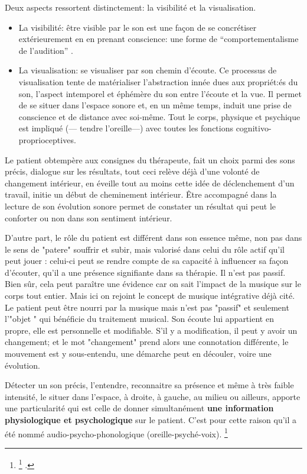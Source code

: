 Deux aspects ressortent distinctement: la visibilité et la visualisation.
\begin{itemize}
 
\item La visibilité: être visible par le son est une façon de se concrétiser extérieurement en en prenant conscience: une forme de ``comportementalisme de l'audition'' .


\item La visualisation: se visualiser par son chemin d'écoute.  
Ce processus de visualisation tente de matérialiser l'abstraction innée dues aux propriét:és du son, l'aspect intemporel et éphémère du son entre l'écoute et la vue.
Il permet de se situer dans l'espace sonore et, en un même temps, induit une prise de conscience et de distance avec soi-même. Tout le corps, physique et psychique est impliqué (--- tendre l'oreille---) avec toutes les fonctions cognitivo-proprioceptives.

\end{itemize}

Le patient obtempère aux consignes du thérapeute, fait un choix parmi des sons précis, dialogue sur les résultats, tout ceci relève déjà d'une volonté de changement intérieur, en  éveille tout au moins cette idée de déclenchement d'un travail, initie un début de cheminement intérieur.
Être accompagné dans la lecture de son évolution sonore permet de constater un résultat qui  peut le conforter ou non dans son sentiment intérieur.
	
	D'autre part, le rôle du patient est différent dans son essence même, non pas dans le sens de "patere" souffrir et subir, mais valorisé dans celui du rôle actif qu'il peut jouer : celui-ci peut se rendre compte de sa capacité à influencer sa façon d'écouter, qu'il a une présence signifiante dans sa thérapie.  Il n'est pas passif. Bien sûr, cela peut paraître une évidence car on sait l'impact de la musique sur le corps tout entier. Mais ici on rejoint  le concept de musique intégrative déjà cité\autocite[Cf.]{vrait_musicotherapie_2018}. Le patient peut être nourri par la musique mais n'est pas "passif" et seulement l'"objet " qui bénéficie du traitement musical. Son  écoute lui appartient en propre, elle est personnelle et modifiable. S'il y a modification, il peut y avoir un changement; et le mot "changement" prend alors une connotation différente,  le mouvement est y  sous-entendu,  une démarche peut en découler, voire une évolution. 



 Détecter un son précis, l'entendre, reconnaitre sa présence et même à très
 faible intensité, le situer dans l'espace, à droite, à gauche, au
 milieu ou ailleurs,  apporte une particularité qui est celle de  donner simultanément  \textbf{une information
   physiologique et psychologique} sur le patient.
 C'est pour cette raison qu'il a été nommé
 audio-psycho-phonologique (oreille-psyché-voix). \footnote{\footnote{Avec le professeur Tomatis: formation suivie dès 1995, Boulevard de Courcelles, Centre de l'écoute 
Tomatis à Paris; puis en 2009/11/13/15 avec V. Gas, V. Drouot et J.P. Granier, formateurs et consultants. Source: site internet officiel: \cite{tomatis.com}.}
.}
   

